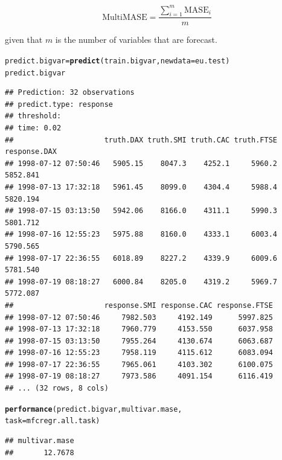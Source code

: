 \documentclass[12pt]{article}\usepackage[]{graphicx}\usepackage[]{color}
\makeatletter
\newcommand{\hlstd}[1]{\textcolor[rgb]{0.345,0.345,0.345}{#1}}%
\newcommand{\hlkwb}[1]{\textcolor[rgb]{0.69,0.353,0.396}{#1}}%
\newcommand{\hlkwc}[1]{\textcolor[rgb]{0.333,0.667,0.333}{#1}}%
\newcommand{\hlkwd}[1]{\textcolor[rgb]{0.737,0.353,0.396}{\textbf{#1}}}%
\newenvironment{kframe}{%
 \def\at@end@of@kframe{}%
 \ifinner\ifhmode%
  \def\at@end@of@kframe{\end{minipage}}%
  \begin{minipage}{\columnwidth}%
 \fi\fi%
 \def\FrameCommand##1{\hskip\@totalleftmargin \hskip-\fboxsep
 \colorbox{shadecolor}{##1}\hskip-\fboxsep
     \hskip-\linewidth \hskip-\@totalleftmargin \hskip\columnwidth}%
 \MakeFramed {\advance\hsize-\width
   \@totalleftmargin\z@ \linewidth\hsize
   \@setminipage}}%
 {\par\unskip\endMakeFramed%
 \at@end@of@kframe}
\newenvironment{knitrout}{}{} %
\theoremstyle{definition}
\makeatother
\begin{document}
\begin{equation}
\text{MultiMASE} = \frac{\sum_{i=1}^m \text{MASE}_i}{m}
\end{equation}

given that $m$ is the number of variables that are forecast.

\singlespacing
\begin{knitrout}
\color{fgcolor}\begin{kframe}
\begin{alltt}
\hlstd{predict.bigvar} \hlkwb{=} \hlkwd{predict}\hlstd{(train.bigvar,} \hlkwc{newdata} \hlstd{= eu.test)}
\hlstd{predict.bigvar}
\end{alltt}
\begin{verbatim}
## Prediction: 32 observations
## predict.type: response
## threshold: 
## time: 0.02
##                     truth.DAX truth.SMI truth.CAC truth.FTSE response.DAX
## 1998-07-12 07:50:46   5905.15    8047.3    4252.1     5960.2     5852.841
## 1998-07-13 17:32:18   5961.45    8099.0    4304.4     5988.4     5820.194
## 1998-07-15 03:13:50   5942.06    8166.0    4311.1     5990.3     5801.712
## 1998-07-16 12:55:23   5975.88    8160.0    4333.1     6003.4     5790.565
## 1998-07-17 22:36:55   6018.89    8227.2    4339.9     6009.6     5781.540
## 1998-07-19 08:18:27   6000.84    8205.0    4319.2     5969.7     5772.087
##                     response.SMI response.CAC response.FTSE
## 1998-07-12 07:50:46     7982.503     4192.149      5997.825
## 1998-07-13 17:32:18     7960.779     4153.550      6037.958
## 1998-07-15 03:13:50     7955.264     4130.674      6063.687
## 1998-07-16 12:55:23     7958.119     4115.612      6083.094
## 1998-07-17 22:36:55     7965.061     4103.302      6100.075
## 1998-07-19 08:18:27     7973.586     4091.154      6116.419
## ... (32 rows, 8 cols)
\end{verbatim}
\begin{alltt}
\hlkwd{performance}\hlstd{(predict.bigvar, multivar.mase,}
            \hlkwc{task} \hlstd{= mfcregr.all.task)}
\end{alltt}
\begin{verbatim}
## multivar.mase 
##       12.7678
\end{verbatim}
\end{kframe}
\end{knitrout}
\end{document}
